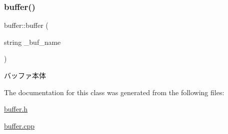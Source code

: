 \subsubsection{\texorpdfstring{buffer()}{buffer()}}
{\footnotesize\ttfamily buffer\+::buffer (\begin{DoxyParamCaption}\item[{string}]{\+\_\+buf\+\_\+name }\end{DoxyParamCaption})}



バッファ本体 



The documentation for this class was generated from the following files\+:\begin{DoxyCompactItemize}
\item 
\hyperlink{buffer_8h}{buffer.\+h}\item 
\hyperlink{buffer_8cpp}{buffer.\+cpp}\end{DoxyCompactItemize}
